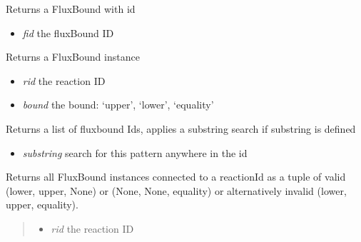 \documentclass[a4paper,11pt,english]{sphinxmanual}
\begin{document}
\begin{fulllineitems}
\begin{fulllineitems}
\label{modules_doc:cbmpy.CBModel.Model.getFluxBoundByID}
Returns a FluxBound with id
\begin{itemize}
\item {} 
\emph{fid} the fluxBound ID

\end{itemize}

\end{fulllineitems}


\begin{fulllineitems}
\label{modules_doc:cbmpy.CBModel.Model.getFluxBoundByReactionID}
Returns a FluxBound instance
\begin{itemize}
\item {} 
\emph{rid} the reaction ID

\item {} 
\emph{bound} the bound: `upper', `lower', `equality'

\end{itemize}

\end{fulllineitems}


\begin{fulllineitems}
\label{modules_doc:cbmpy.CBModel.Model.getFluxBoundIds}
Returns a list of fluxbound Ids, applies a substring search if substring is defined
\begin{itemize}
\item {} 
\emph{substring} search for this pattern anywhere in the id

\end{itemize}

\end{fulllineitems}


\begin{fulllineitems}
\label{modules_doc:cbmpy.CBModel.Model.getFluxBoundsByReactionID}
Returns all FluxBound instances connected to a reactionId as a tuple of valid
(lower, upper, None) or (None, None, equality) or alternatively invalid (lower, upper, equality).
\begin{quote}
\begin{itemize}
\item {} 
\emph{rid} the reaction ID


\end{itemize}
\end{quote}
\end{fulllineitems}
\end{fulllineitems}
\end{document}
